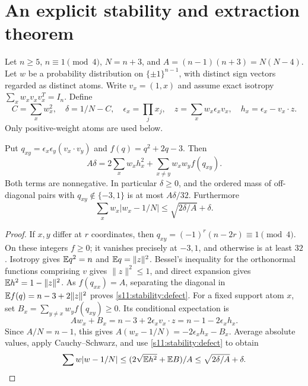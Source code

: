 

\section{An explicit stability and extraction theorem}

Let $n\ge5$, $n\equiv1\pmod4$, $N=n+3$, and
$A=(n-1)(n+3)=N(N-4)$. Let $w$ be a probability distribution on
$\{\pm1\}^{n-1}$, with distinct sign vectors regarded as distinct atoms.
Write $v_x=(1,x)$ and assume exact isotropy
$\sum_x w_xv_xv_x^T=I_n$. Define
\[
 C=\sum_xw_x^2,\quad \delta=1/N-C,\quad
 \epsilon_x=\prod_jx_j,\quad z=\sum_xw_x\epsilon_xv_x,
 \quad h_x=\epsilon_x-v_x\cdot z.
\]
Only positive-weight atoms are used below.

\begin{theorem}
Put $q_{xy}=\epsilon_x\epsilon_y(v_x\cdot v_y)$ and
$f(q)=q^2+2q-3$. Then
\begin{equation}\label{s11:stability:defect}
 A\delta=2\sum_xw_xh_x^2+
 \sum_{x\ne y}w_xw_y f(q_{xy}).
\end{equation}
Both terms are nonnegative. In particular $\delta\ge0$, and the
ordered mass of off-diagonal pairs with $q_{xy}\notin\{-3,1\}$ is
at most $A\delta/32$. Furthermore
\begin{equation}\label{s11:stability:disp}
 \sum_xw_x|w_x-1/N|\le \sqrt{2\delta/A}+\delta.
\end{equation}
\end{theorem}
\begin{proof}
If $x,y$ differ at $r$ coordinates, then
$q_{xy}=(-1)^r(n-2r)\equiv1\pmod4$. On these integers $f\ge0$;
it vanishes precisely at $-3,1$, and otherwise is at least $32$.
Isotropy gives $\mathbb E q^2=n$ and $\mathbb E q=\|z\|^2$.
Bessel's inequality for the orthonormal functions comprising $v$ gives
$\|z\|^2\le1$, and direct expansion gives
$\mathbb E h^2=1-\|z\|^2$. As $f(q_{xx})=A$, separating the diagonal in
$\mathbb E f(q)=n-3+2\|z\|^2$ proves \eqref{s11:stability:defect}.
For a fixed support atom $x$, set
$B_x=\sum_{y\ne x}w_yf(q_{xy})\ge0$. Its conditional expectation is
\[
 Aw_x+B_x=n-3+2\epsilon_x v_x\cdot z
 =n-1-2\epsilon_xh_x.
\]
Since $A/N=n-1$, this gives
$A(w_x-1/N)=-2\epsilon_xh_x-B_x$. Average absolute values,
apply Cauchy--Schwarz, and use \eqref{s11:stability:defect} to obtain
\[
 \sum w|w-1/N|\le (2\sqrt{\mathbb E h^2}+\mathbb E B)/A
 \le\sqrt{2\delta/A}+\delta.
\]
\end{proof}

